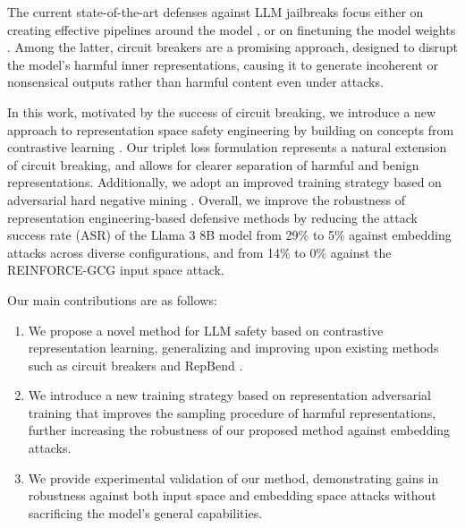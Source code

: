 \documentclass[11pt]{article}
\begin{document}
The current state-of-the-art defenses against LLM jailbreaks focus either on creating effective pipelines around the model \citep{zeng2024autodefensemultiagentllmdefense, yuan2024rigorllmresilientguardrailslarge}, or on finetuning the model weights \citep{yousefpour2025representationbendinglargelanguage, zhang2024negativepreferenceoptimizationcatastrophic}. Among the latter, circuit breakers \citep{zou2024improvingalignmentrobustnesscircuit} are a promising approach, designed to disrupt the model's harmful inner representations, causing it to generate incoherent or nonsensical outputs rather than harmful content even under attacks.

In this work, motivated by the success of circuit breaking, we introduce a new approach to representation space safety engineering by building on concepts from contrastive learning \citep{khosla2021supervisedcontrastivelearning}. Our triplet loss formulation represents a natural extension of circuit breaking, and allows for clearer separation of harmful and benign representations. Additionally, we adopt an improved training strategy based on adversarial hard negative mining \citep{casper2024defendingunforeseenfailuremodes}. Overall, we improve the robustness of representation engineering-based defensive methods by reducing the attack success rate (ASR) of the Llama 3 8B model from 29\% to 5\% against embedding attacks across diverse configurations, and from 14\% to 0\% against the REINFORCE-GCG \citep{geisler2025reinforceadversarialattackslarge} input space attack.

Our main contributions are as follows:

\begin{enumerate}
  \item We propose a novel method for LLM safety based on contrastive representation learning, generalizing and improving upon existing methods
    such as circuit breakers \citep{zou2024improvingalignmentrobustnesscircuit} and RepBend \citep{yousefpour2025representationbendinglargelanguage}.
  \item We introduce a new training strategy based on representation adversarial training \citep{casper2024defendingunforeseenfailuremodes} that improves the sampling procedure of harmful representations, further increasing the robustness of our proposed method against embedding attacks.
  \item We provide experimental validation of our method, demonstrating gains in robustness against both input space and embedding space attacks without sacrificing the model's general capabilities.
\end{enumerate}
\end{document}
